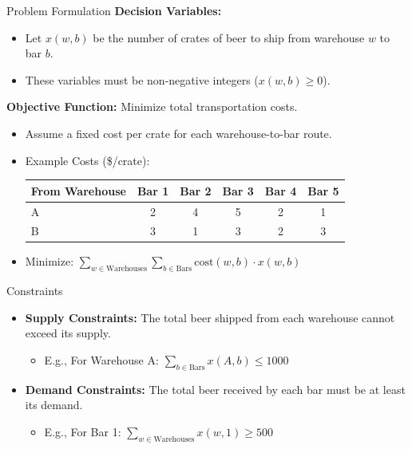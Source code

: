 \documentclass{purdue-slide}
\begin{document}
\begin{frame}{Problem Formulation}
	\textbf{Decision Variables:}
	\begin{itemize}
		\item Let $x(w,b)$ be the number of crates of beer to ship from warehouse $w$ to bar $b$.
		\item These variables must be non-negative integers ($x(w,b) \ge 0$).
	\end{itemize}

	\textbf{Objective Function:} Minimize total transportation costs.
	\begin{itemize}
		\item Assume a fixed cost per crate for each warehouse-to-bar route.
		\item Example Costs (\$/crate):
			\tiny
			\begin{center}
				\begin{tabular}{lccccc}
					\toprule
					From Warehouse & Bar 1 & Bar 2 & Bar 3 & Bar 4 & Bar 5 \\
					\midrule
					A & 2 & 4 & 5 & 2 & 1 \\
					B & 3 & 1 & 3 & 2 & 3 \\
					\bottomrule
				\end{tabular}
			\end{center}
			\normalsize
		\item Minimize: $\sum_{w \in \text{Warehouses}} \sum_{b \in \text{Bars}} \text{cost}(w,b) \cdot x(w,b)$
	\end{itemize}
\end{frame}

\begin{frame}{Constraints}
	\begin{itemize}
		\item \textbf{Supply Constraints:} The total beer shipped from each warehouse cannot exceed its supply.
			\begin{itemize}
				\item E.g., For Warehouse A: $\sum_{b \in \text{Bars}} x(A,b) \leq 1000$
			\end{itemize}
		\item \textbf{Demand Constraints:} The total beer received by each bar must be at least its demand.
			\begin{itemize}
				\item E.g., For Bar 1: $\sum_{w \in \text{Warehouses}} x(w,1) \geq 500$
			\end{itemize}
	\end{itemize}
\end{frame}
\end{document}
